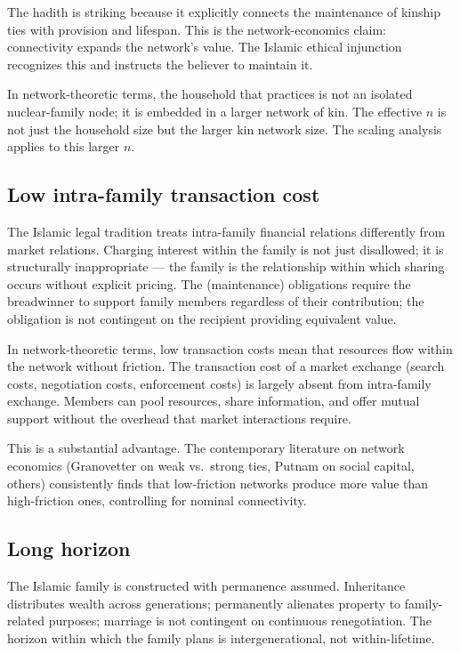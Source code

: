 The hadith is striking because it explicitly connects the
maintenance of kinship ties with provision and lifespan. This is the
network-economics claim: connectivity expands the network's value.
The Islamic ethical injunction recognizes this and instructs the
believer to maintain it.

In network-theoretic terms, the household that practices
 is not an isolated nuclear-family node; it is
embedded in a larger network of kin. The effective $n$ is not just
the household size but the larger kin network size. The scaling
analysis applies to this larger $n$.

\subsection{Low intra-family transaction cost}

The Islamic legal tradition treats intra-family financial relations
differently from market relations. Charging interest within the
family is not just disallowed; it is structurally inappropriate ---
the family is the relationship within which sharing occurs without
explicit pricing. The  (maintenance) obligations
require the breadwinner to support family members regardless of
their contribution; the obligation is not contingent on the
recipient providing equivalent value.

In network-theoretic terms, low transaction costs mean that
resources flow within the network without friction. The transaction
cost of a market exchange (search costs, negotiation costs,
enforcement costs) is largely absent from intra-family exchange.
Members can pool resources, share information, and offer mutual
support without the overhead that market interactions require.

This is a substantial advantage. The contemporary literature on
network economics (Granovetter on weak vs.\ strong ties, Putnam on
social capital, others) consistently finds that low-friction
networks produce more value than high-friction ones, controlling
for nominal connectivity.

\subsection{Long horizon}

The Islamic family is constructed with permanence assumed.
Inheritance distributes wealth across generations; 
permanently alienates property to family-related purposes;
marriage is not contingent on continuous renegotiation. The horizon
within which the family plans is intergenerational, not
within-lifetime.

